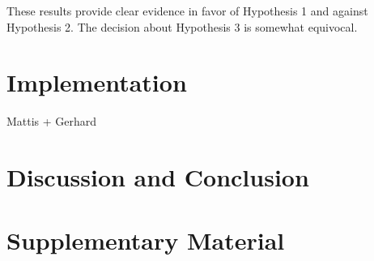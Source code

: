 \documentclass[10pt, a4paper]{article}
\begin{document}
These results provide clear evidence in favor of Hypothesis 1 and against Hypothesis 2. The decision about Hypothesis 3 is somewhat equivocal.

\section{Implementation}

Mattis + Gerhard


\section{Discussion and Conclusion}

\section{Supplementary Material}









\newpage
\end{document}
